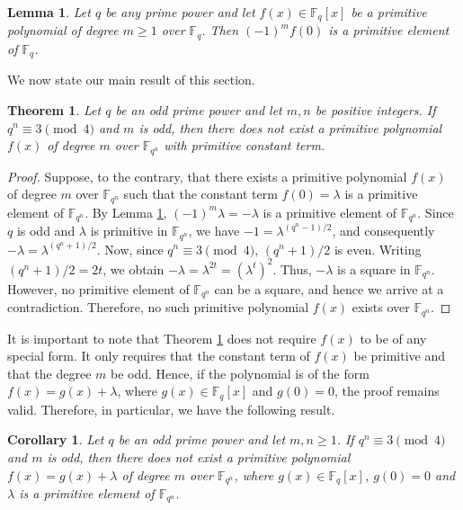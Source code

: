 \documentclass[preprint,12pt]{elsarticle}
\newtheorem{theorem}{Theorem}[section]
\newtheorem{lemma}{Lemma}[section]
\newtheorem{cor}{Corollary}[section]
\begin{document}
    \begin{lemma}{\upshape\cite[Theorem 3.18]{Nieder}}\label{L2.1}
        Let $q$ be any prime power and let $f(x)\in\mathbb{F}_{q}[x]$ be a primitive polynomial of degree $m\geq 1$ over $\mathbb{F}_{q}$. Then $(-1)^mf(0)$ is a primitive element of $\mathbb{F}_{q}$.
    \end{lemma}
    
    We now state our main result of this section.

    \begin{theorem}\label{T2.1}
        Let $q$ be an odd prime power and let $m,n$ be positive integers. If $q^n\equiv3\pmod{4}$ and $m$ is odd, then there does not exist a primitive polynomial $f(x)$ of degree $m$ over $\mathbb{F}_{q^n}$ with primitive constant term.
    \end{theorem}

    \begin{proof}
        Suppose, to the contrary, that there exists a primitive polynomial $f(x)$ of degree $m$ over $\mathbb{F}_{q^n}$ such that the constant term $f(0)=\lambda$ is a primitive element of $\mathbb{F}_{q^n}$. By Lemma \ref{L2.1}, $(-1)^m\lambda=-\lambda$ is a primitive element of $\mathbb{F}_{q^n}$. Since $q$ is odd and $\lambda$ is primitive in $\mathbb{F}_{q^n}$, we have $-1=\lambda^{(q^n-1)/2}$, and consequently $-\lambda=\lambda^{(q^n+1)/2}$. Now, since $q^n\equiv 3\pmod{4}$, $(q^n+1)/2$ is even. Writing $(q^n+1)/2=2t$, we obtain $-\lambda=\lambda^{2t}=(\lambda^t)^2$. Thus, $-\lambda$ is a square in $\mathbb{F}_{q^n}$. However, no primitive element of $\mathbb{F}_{q^n}$ can be a square, and hence we arrive at a contradiction. Therefore, no such primitive polynomial $f(x)$ exists over $\mathbb{F}_{q^n}$.
    \end{proof}

        It is important to note that {\upshape Theorem \ref{T2.1}} does not require $f(x)$ to be of any special form. It only requires that the constant term of $f(x)$ be primitive and that the degree $m$ be odd. Hence, if the polynomial is of the form $f(x)=g(x)+\lambda$, where $g(x)\in\mathbb{F}_q[x]$ and $g(0)=0$, the proof remains valid. Therefore, in particular, we have the following result.

    \begin{cor}\label{Cor2.1}
        Let $q$ be an odd prime power and let $m,n\geq1$. If $q^n\equiv3\pmod{4}$ and $m$ is odd, then there does not exist a primitive polynomial $f(x)=g(x)+\lambda$ of degree $m$ over $\mathbb{F}_{q^n}$, where $g(x)\in\mathbb{F}_q[x]$, $g(0)=0$ and $\lambda$ is a primitive element of $\mathbb{F}_{q^n}$.
    \end{cor}
\end{document}
